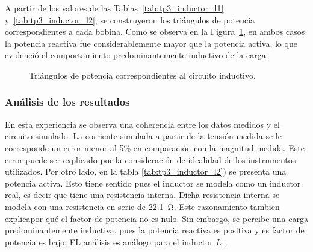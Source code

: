 A partir de los valores de las Tablas~\ref{tab:tp3_inductor_l1} y~\ref{tab:tp3_inductor_l2}, se construyeron los triángulos de potencia correspondientes a cada bobina. Como se observa en la Figura~\ref{fig:triangulos_inductivo}, en ambos casos la potencia reactiva fue considerablemente mayor que la potencia activa, lo que evidenció el comportamiento predominantemente inductivo de la carga.

\begin{figure}[H]
    \centering
    \begin{minipage}{0.38\textwidth}
        \centering
    \end{minipage}
    \hspace{0.8cm}
    \begin{minipage}{0.38\textwidth}
        \centering
    \end{minipage}
    \caption{Triángulos de potencia correspondientes al circuito inductivo.}
    \label{fig:triangulos_inductivo}
\end{figure}

\subsubsection{Análisis de los resultados}

En esta experiencia se observa una coherencia entre los datos medidos y el circuito simulado. La corriente simulada a partir de la tensión medida se le corresponde un error menor al 5\% en comparación con la magnitud medida. Este error puede ser explicado por la consideración de idealidad de los instrumentos utilizados. 
Por otro lado, en la tabla \ref{tab:tp3_inductor_l2}) se presenta una potencia activa. Esto tiene sentido pues el inductor se modela como un inductor real, es decir que tiene una resistencia interna. Dicha resistencia interna se modela con una resistencia en serie de \SI{22.1}{\ohm}. Este razonamiento tambien explicapor qué el factor de potencia no es nulo. Sin embargo, se percibe una carga predominantemente inductiva, pues la potencia reactiva es positiva y es factor de potencia es bajo. EL análisis es análogo para el inductor $L_1$.


